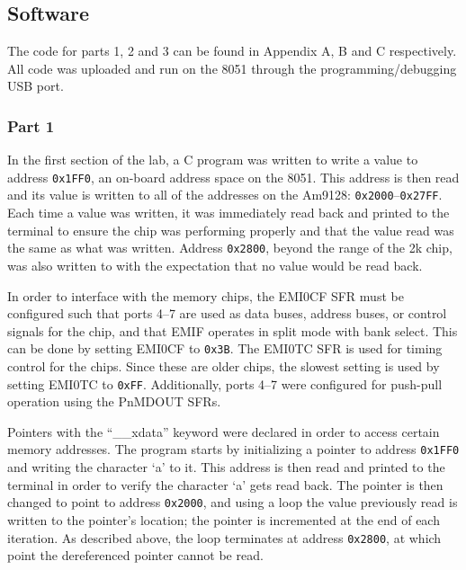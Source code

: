 \documentclass[12pt]{article}
\begin{document}
\subsection{Software}
The code for parts 1, 2 and 3 can be found in Appendix A, B and C respectively. All code was uploaded and run on the 8051 through the programming/debugging USB port. 

\subsubsection{Part 1}
In the first section of the lab, a C program was written to write a value to address \texttt{0x1FF0}, an on-board address space on the 8051. This address is then read and its value is written to all of the addresses on the Am9128: \texttt{0x2000}--\texttt{0x27FF}. Each time a value was written, it was immediately read back and printed to the terminal to ensure the chip was performing properly and that the value read was the same as what was written. Address \texttt{0x2800}, beyond the range of the 2k chip, was also written to with the expectation that no value would be read back.

In order to interface with the memory chips, the EMI0CF SFR must be configured such that ports 4--7 are used as data buses, address buses, or control signals for the chip, and that EMIF operates in split mode with bank select. This can be done by setting EMI0CF to \texttt{0x3B}. The EMI0TC SFR is used for timing control for the chips. Since these are older chips, the slowest setting is used by setting EMI0TC to \texttt{0xFF}. Additionally, ports 4--7 were configured for push-pull operation using the PnMDOUT SFRs. 

Pointers with the ``\_\_xdata'' keyword were declared in order to access certain memory addresses. The program starts by initializing a pointer to address \texttt{0x1FF0} and writing the character `a' to it. This address is then read and printed to the terminal in order to verify the character `a' gets read back. The pointer is then changed to point to address \texttt{0x2000}, and using a loop the value previously read is written to the pointer\textquoteright s location; the pointer is incremented at the end of each iteration. As described above, the loop terminates at address \texttt{0x2800}, at which point the dereferenced pointer cannot be read.
\end{document}
